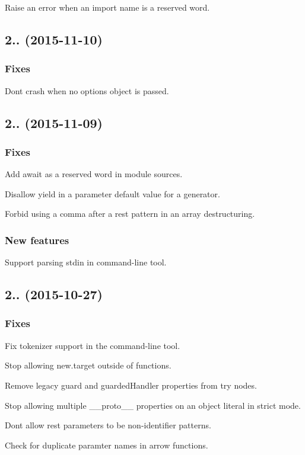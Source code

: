 Raise an error when an import name is a reserved word.

\subsection*{2.. (2015-\/11-\/10)}

\subsubsection*{Fixes}

Don\textquotesingle{}t crash when no options object is passed.

\subsection*{2.. (2015-\/11-\/09)}

\subsubsection*{Fixes}

Add {\ttfamily await} as a reserved word in module sources.

Disallow {\ttfamily yield} in a parameter default value for a generator.

Forbid using a comma after a rest pattern in an array destructuring.

\subsubsection*{New features}

Support parsing stdin in command-\/line tool.

\subsection*{2.. (2015-\/10-\/27)}

\subsubsection*{Fixes}

Fix tokenizer support in the command-\/line tool.

Stop allowing {\ttfamily new.\+target} outside of functions.

Remove legacy {\ttfamily guard} and {\ttfamily guarded\+Handler} properties from try nodes.

Stop allowing multiple {\ttfamily \+\_\+\+\_\+proto\+\_\+\+\_\+} properties on an object literal in strict mode.

Don\textquotesingle{}t allow rest parameters to be non-\/identifier patterns.

Check for duplicate paramter names in arrow functions. 